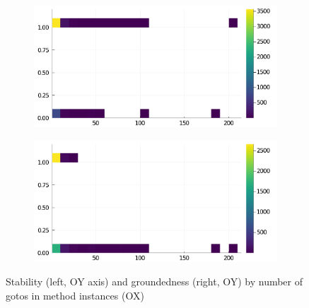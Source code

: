 \begin{figure}[h]
     \begin{subfigure}[b]{0.49\textwidth}
       \includegraphics[width=\textwidth]{figs/all-package-graphs/Gadfly-gotos-vs-stable.pdf}
     \end{subfigure}
     \begin{subfigure}[b]{0.49\textwidth}
       \includegraphics[width=\textwidth]{figs/all-package-graphs/Gadfly-gotos-vs-grounded.pdf}
     \end{subfigure}
\caption{Stability (left, OY axis) and groundedness (right, OY) by number of gotos in method instances (OX)}%
%
\label{figs:gotos:Gadfly}
\end{figure}

